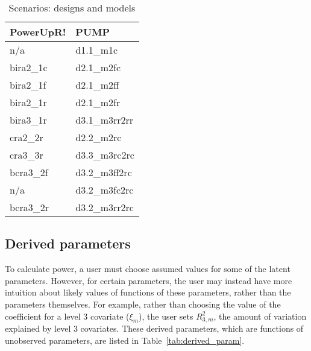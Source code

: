 \documentclass[12pt]{article}
\begin{document}
\begin{table}[h!]
\begin{tabular}{l | l}
\textbf{PowerUpR!}	& \textbf{PUMP} \\ \hline
n/a 				& d1.1\_m1c \\
bira2\_1c 			& d2.1\_m2fc \\
bira2\_1f 			& d2.1\_m2ff \\
bira2\_1r 			& d2.1\_m2fr \\
bira3\_1r 			& d3.1\_m3rr2rr \\
cra2\_2r 			& d2.2\_m2rc \\
cra3\_3r 			& d3.3\_m3rc2rc \\
bcra3\_2f 			& d3.2\_m3ff2rc \\
n/a					& d3.2\_m3fc2rc \\
bcra3\_2r 			& d3.2\_m3rr2rc \\
\end{tabular}
\caption{Scenarios: designs and models\label{tab:names}}
\end{table}



\subsection{Derived parameters}

To calculate power, a user must choose assumed values for some of the latent parameters.
However, for certain parameters, the user may instead have more intuition about likely values of functions of these parameters, rather than the parameters themselves.
For example, rather than choosing the value of the coefficient for a level 3 covariate ($\xi_m$), the user sets $R_{3,m}^2$, the amount of variation explained by level 3 covariates. 
These derived parameters, which are functions of unobserved parameters, are listed in Table~\ref{tab:derived_param}.
\end{document}
